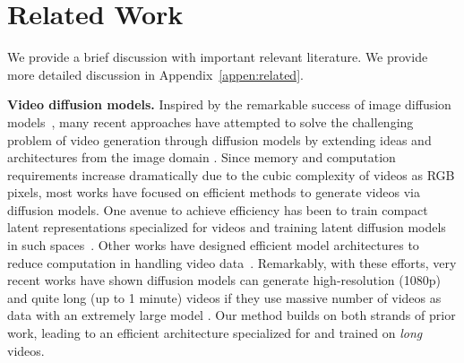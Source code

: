 \section{Related Work}

We provide a brief discussion with important relevant literature. We provide more detailed discussion in Appendix~\ref{appen:related}. 

\vspace{0.02in}
\noindent\textbf{Video diffusion models.}
Inspired by the remarkable success of image diffusion models~\citep{rombach2021highresolution,chen2023pixart}, many
recent approaches have attempted to solve the challenging problem of video generation through diffusion models by extending ideas and architectures
from the image domain \citep{blattmann2023align,gupta2023photorealistic,ho2022video,harvey2022flexible,he2022lvdm,ge2023preserve,lu2023vdt,ma2024latte,ho2022imagen,singer2022make,voleti2022mcvd,weng2023art,yin2023nuwa,yu2023video,yu2024efficient,zhou2022magicvideo}. Since memory and computation requirements increase 
dramatically due to the cubic complexity of videos as RGB pixels, most works have focused on efficient methods to generate videos via diffusion models. One avenue to achieve efficiency has been to train compact latent representations specialized for videos and training latent diffusion models in such spaces~\citep{gupta2023photorealistic,he2022lvdm,yu2023video,yu2024efficient}. Other works have designed efficient 
model architectures to reduce computation in handling video data~\citep{gupta2023photorealistic,bar2024lumiere,yu2024efficient}. Remarkably, with these efforts, very recent works have shown diffusion models can generate high-resolution (1080p) and quite long (up to 1 minute) videos if they use massive number of videos as data with an extremely large model \citep{veo,videoworldsimulators2024}. Our method builds on both strands of prior work, leading to an
efficient architecture specialized for and trained on \emph{long} videos.

